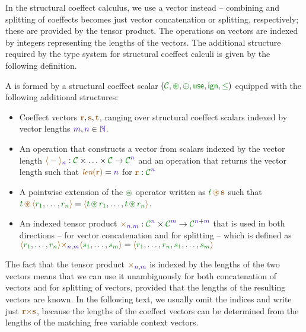 In the structural coeffect calculus, we use a vector instead -- combining and splitting of 
coeffects becomes just vector concatenation or splitting, respectively; these are provided
by the tensor product. The operations on vectors are indexed by integers representing the lengths
of the vectors. The additional structure required by the type system for structural coeffect 
calculi is given by the following definition.

\begin{definition}
A \emph{} is formed by a structural coeffect scalar 
$(\C, \cseq, \cpar, \cunit, \czero, \cleq)$ equipped with the following additional structures:

\begin{itemize}
\item Coeffect vectors $\aclrd{\textbf{r}}, \aclrd{\textbf{s}}, \aclrd{\textbf{t}}$, ranging over
  structural coeffect scalars indexed by vector lengths $\sclrd{m}, \sclrd{n} \in \sclrd{\mathbb{N}}$.

\item An operation that constructs a vector from scalars indexed by the vector length
  $\alift{-}_{\sclrd{n}} : \C \times \ldots \times \C \rightarrow \C^{\sclrd{n}}$
  and an operation that returns the vector length such that 
  $\alen{\aclrd{\textbf{r}}} = \sclrd{n}$ for $\aclrd{\textbf{r}} : \C^{\sclrd{n}}$

\item A pointwise extension of the $\cseq$ operator written as $\cclrd{t} \,\aseq\, \aclrd{\textbf{s}}$
  such that\\ $\cclrd{t} \,\aseq\, \alift{\cclrd{r_1}, \ldots, \cclrd{r_n}} = 
    \alift{\cclrd{t} \,\cseq\,\cclrd{r_1}, \ldots, \cclrd{t} \,\cseq\,\cclrd{r_n}}$.

\item An indexed tensor product $\atimes_{\sclrd{n},\sclrd{m}} : \C^{\sclrd{n}} \times \C^{\sclrd{m}} \rightarrow \C^{\sclrd{n}+\sclrd{m}}$
  that is used in both directions -- for vector concatenation and for splitting -- 
  which is defined as $\alift{\cclrd{r_1}, \ldots, \cclrd{r_n}} 
     \atimes_{\sclrd{n}, \sclrd{m}} \alift{\cclrd{s_1}, \ldots, \cclrd{s_m}}
   = \alift{\cclrd{r_1}, \ldots, \cclrd{r_n}, \cclrd{s_1}, \ldots, \cclrd{s_m}}$
\end{itemize}
\end{definition}

\noindent
The fact that the tensor product $\atimes_{\sclrd{n},\sclrd{m}}$ is indexed by the lengths
of the two vectors means that we can use it unambiguously for both concatenation of vectors
and for splitting of vectors, provided that the lengths of the resulting vectors are known.
In the following text, we usually omit the indices and write just 
$\aclrd{\textbf{r}} \atimes \aclrd{\textbf{s}}$, because the lengths of the coeffect vectors 
can be determined from the lengths of the matching free variable context vectors.

